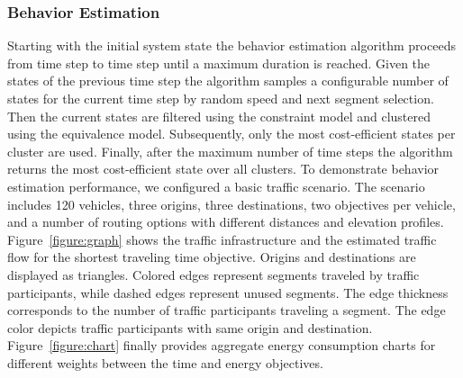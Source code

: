 \documentclass[conference]{../cls/IEEEtran}
\begin{document}
\subsubsection*{Behavior Estimation}

Starting with the initial system state the behavior estimation algorithm
proceeds from time step to time step until a maximum duration is reached. Given
the states of the previous time step the algorithm samples a configurable number of states for the current time step by random speed and next segment selection. Then the current states are filtered using the constraint model and clustered using the equivalence model. Subsequently, only the most cost-efficient states per cluster are used. Finally, after the maximum number of time steps the algorithm returns the most cost-efficient state over all clusters. To demonstrate behavior estimation performance, we configured a basic traffic scenario. The scenario includes 120 vehicles, three origins, three destinations, two objectives per vehicle, and a number of routing options with different distances and elevation profiles. Figure~\ref{figure:graph} shows the traffic infrastructure and the estimated traffic flow for the shortest traveling time objective. Origins and destinations are displayed as triangles. Colored edges represent segments traveled by traffic participants, while dashed edges represent unused segments. The edge thickness corresponds to the number of traffic participants traveling a segment. The edge color depicts traffic participants with same origin and destination. Figure~\ref{figure:chart} finally provides aggregate energy consumption charts for different weights between the time and energy objectives.

\end{document}
